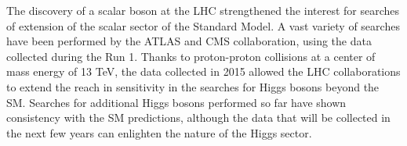 The discovery of a scalar boson at the LHC
strengthened the interest for searches of extension of the scalar sector of the Standard Model.
A vast variety of searches have been performed by the ATLAS and CMS collaboration, using the data collected during the Run 1.  Thanks to proton-proton collisions at a center of mass energy of 13 TeV, the data collected in 2015 allowed the LHC collaborations to extend the reach in sensitivity in the searches for Higgs bosons beyond the SM. Searches for additional Higgs bosons performed so far have shown consistency with the SM predictions, although the data that will be collected in the next few years can enlighten the nature of the Higgs sector.